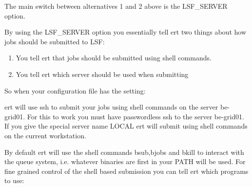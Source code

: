 \documentclass[a4paper,10pt,english]{sphinxmanual}
\begin{document}
The main switch between alternatives 1 and 2 above is the LSF\_SERVER option.

\label{\detokenize{keywords/index:lsf-server}}
\begin{sphinxShadowBox}

By using the LSF\_SERVER option you essentially tell ert two things about how
jobs should be submitted to LSF:
\begin{enumerate}
\item {} 
You tell ert that jobs should be submitted using shell commands.

\item {} 
You tell ert which server should be used when submitting

\end{enumerate}

So when your configuration file has the setting:

%
\begin{sphinxVerbatim}[commandchars=\\\{\}]
   
\end{sphinxVerbatim}

ert will use ssh to submit your jobs using shell commands on the server
be-grid01. For this to work you must have passwordless ssh to the server
be-grid01. If you give the special server name LOCAL ert will submit using
shell commands on the current workstation.


By default ert will use the shell commands bsub,bjobs and bkill to interact
with the queue system, i.e. whatever binaries are first in your PATH will be
used. For fine grained control of the shell based submission you can tell ert
which programs to use:

%
\begin{sphinxVerbatim}[commandchars=\\\{\}]
       
        
\end{sphinxVerbatim}



\end{sphinxShadowBox}
\end{document}
